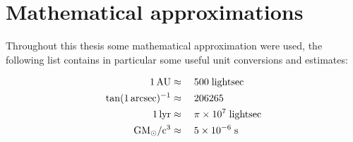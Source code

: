 \chapter{Mathematical approximations}

Throughout this thesis some mathematical approximation were used, the following
list contains in particular some useful unit conversions and estimates:

\begin{align}
    1\,\AU &\approx\quad 500\;\lightsec\eqlbl{au}\\
    \tan(1\,\arcsec)^{-1} &\approx\quad 206265\eqlbl{arcsectan}\\
    1\,\lyr &\approx\quad \pi \times 10^{7}\;\lightsec\eqlbl{lyr}\\
    \Grav\Msol/\lspeed^{3} &\approx\quad 5 \times 10^{-6}\;\secs\eqlbl{GMcinsec}
\end{align}
